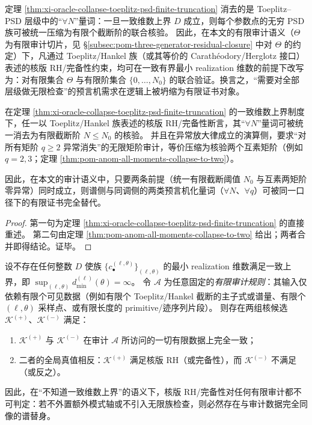 \begin{remark}\label{rem:xi-oracle-collapse-finite-certification}
定理 \ref{thm:xi-oracle-collapse-toeplitz-psd-finite-truncation} 消去的是 Toeplitz--PSD 层级中的“\(\forall N\)”量词：一旦一致维数上界 \(D\) 成立，则每个参数点的无穷 PSD 族可被统一压缩为有限个截断阶的联合核验。
因此，在本文的有限审计语义（\(\Theta\) 为有限审计切片，见 \S\ref{subsec:pom-three-generator-residual-closure} 中对 \(\Theta\) 的约定）下，凡通过 Toeplitz/Hankel 族（或其等价的 Carath\'eodory/Herglotz 接口）表述的核版 RH/完备性约束，均可在一致有界最小 realization 维数的前提下改写为：对有限集合 \(\Theta\) 与有限阶集合 \(\{0,\dots,N_0\}\) 的联合验证。换言之，“需要对全部层级做无限检查”的预言机需求在逻辑上被坍缩为有限证书对象。
\end{remark}

\begin{corollary}\label{cor:xi-oracle-elimination-two-axes}
在定理 \ref{thm:xi-oracle-collapse-toeplitz-psd-finite-truncation} 的一致维数上界制度下，任一以 Toeplitz/Hankel 族表述的核版 RH/完备性断言，其“\(\forall N\)”量词可被统一消去为有限截断阶 \(N\le N_0\) 的核验。
并且在异常放大律成立的演算侧，要求“对所有矩阶 \(q\ge 2\) 异常消失”的无限矩阶审计，等价压缩为核验两个互素矩阶（例如 \(q=2,3\)；定理 \ref{thm:pom-anom-all-moments-collapse-to-two}）。
\par
因此，在本文的审计语义中，只要两条前提（统一有限截断阈值 \(N_0\) 与互素两矩阶零异常）同时成立，则谱侧与同调侧的两类预言机化量词（\(\forall N\)、\(\forall q\)）可被同一口径下的有限证书完全替代。
\end{corollary}
\begin{proof}
第一句为定理 \ref{thm:xi-oracle-collapse-toeplitz-psd-finite-truncation} 的直接重述。
第二句由定理 \ref{thm:pom-anom-all-moments-collapse-to-two} 给出；两者合并即得结论。证毕。
\end{proof}

\begin{theorem}[谱替身：无一致维数上界 \texorpdfstring{$\Longrightarrow$}{=>} 任意有限审计不可判定]\label{thm:xi-spectral-surrogate-finite-audit-undecidable}
设不存在任何整数 \(D\) 使族 \(\{c^{(\ell,\theta)}_\bullet\}_{(\ell,\theta)}\) 的最小 realization 维数满足一致上界，即
\(
\sup_{(\ell,\theta)}d_{\min}^{(\ell)}(\theta)=\infty
\)。
令 \(\mathcal A\) 为任意固定的\emph{有限审计规则}：其输入仅依赖有限个可见数据（例如有限个 Toeplitz/Hankel 截断的主子式或谱量、有限个 \((\ell,\theta)\) 采样点、或有限长度的 primitive/迹序列片段）。
则存在两组核候选 \(\mathcal K^{(+)}\)、\(\mathcal K^{(-)}\) 满足：
\begin{enumerate}
  \item \(\mathcal K^{(+)}\) 与 \(\mathcal K^{(-)}\) 在审计 \(\mathcal A\) 所访问的一切有限数据上完全一致；
  \item 二者的全局真值相反：\(\mathcal K^{(+)}\) 满足核版 RH（或完备性），而 \(\mathcal K^{(-)}\) 不满足（或反之）。
\end{enumerate}
因此，在“不知道一致维数上界”的语义下，核版 RH/完备性对任何有限审计都不可判定：若不外置额外模式轴或不引入无限族检查，则必然存在与审计数据完全同像的谱替身。
\end{theorem}

